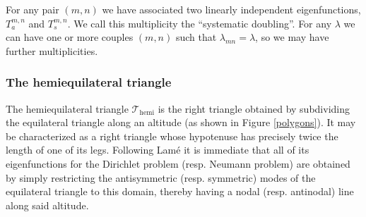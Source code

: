 \documentclass{amsart}
\theoremstyle{definition}
\theoremstyle{remark}
\numberwithin{equation}{section}
\theoremstyle{definition}
\theoremstyle{remark}
\begin{document}
 For any pair $(m,n)$ we have associated two linearly independent eigenfunctions, $T_a^{m,n}$ and $T_s^{m,n}$. We call this multiplicity the ``systematic doubling''. For any $\lambda$ we can have one or more couples $(m,n)$ such that $\lambda_{mn}=\lambda$, so we may have further multiplicities. 

\subsubsection{The hemiequilateral triangle}
The hemiequilateral
triangle $\mathcal{T}_\mathrm{hemi}$ is the right triangle obtained by subdividing the equilateral triangle along
an altitude (as shown in Figure \ref{polygons}). It may be characterized as a right triangle whose hypotenuse has precisely twice the length of one of its legs. Following Lamé \cite{Lamé} it is immediate that all of its eigenfunctions for the Dirichlet problem (resp. Neumann problem) are obtained by simply restricting the antisymmetric (resp. symmetric) modes of the equilateral triangle to this domain, thereby having a nodal (resp. antinodal) line along said altitude.
\end{document}

